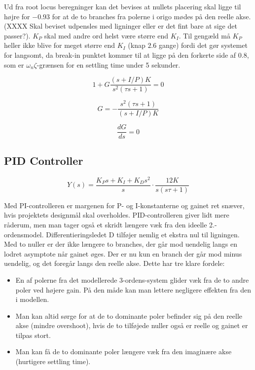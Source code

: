 Ud fra root locus beregninger kan det bevises at nullets placering skal ligge til højre for $-0.93$ for at de to branches fra polerne i origo mødes på den reelle akse. (XXXX Skal beviset udpensles med ligninger eller er det fint bare at sige det passer?). $K_{P}$ skal med andre ord helst være større end $K_{I}$. Til gengæld må $K_{P}$ heller ikke blive for meget større end $K_{I}$ (knap $2.6$ gange) fordi det gør systemet for langsomt, da break-in punktet kommer til at ligge på den forkerte side af $0.8$, som er $\omega_{n}\zeta$-grænsen for en settling time under 5 sekunder. 

\begin{equation}
1+G\frac{(s+I/P)K}{s^2(\tau s+1)}=0
\end{equation}

\begin{equation}
G=-\frac{s^2(\tau s+1)}{(s+I/P)K}
\end{equation}

\begin{equation}
\frac{dG}{ds}=0
\end{equation}

\subsection{PID Controller}

\begin{equation}\label{PID_OpenLoop}
Y(s)=\frac{K_{P}s+K_{I}+K_{D}s^2}{s}\cdot\frac{12K}{s(s\tau+1)}
\end{equation}

Med PI-controlleren er margenen for P- og I-konstanterne og gainet ret snæver, hvis projektets designmål skal overholdes. PID-controlleren giver lidt mere råderum, men man tager også et skridt længere væk fra den ideelle 2.-ordensmodel. Differentieringsledet D tilføjer nemlig et ekstra nul til ligningen. Med to nuller er der ikke længere to branches, der går mod uendelig langs en lodret asymptote når gainet øges. Der er nu kun en branch der går mod minus uendelig, og det foregår langs den reelle akse. Dette har tre klare fordele:

\begin{itemize}
	\item 	En af polerne fra det modellerede 3-ordens-system glider væk fra de to andre poler ved højere gain. På den måde kan man lettere negligere effekten fra den i modellen.
	\item  	Man kan altid sørge for at de to dominante poler befinder sig på den 				   	reelle akse (mindre overshoot), hvis de to tilføjede nuller også er reelle og gainet er tilpas stort. 
	\item  	Man kan få de to dominante poler længere væk fra den imaginære akse 					(hurtigere settling time).
\end{itemize}

